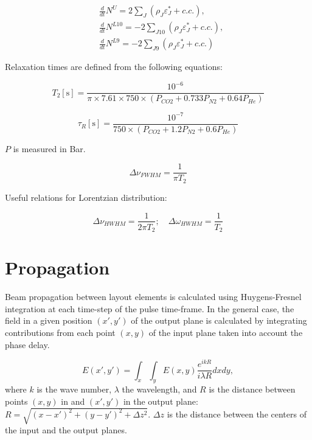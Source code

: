 \documentclass{report}
\begin{document}
\begin{align}\label{eq:dNdt}
&\frac{d}{dt}N^U = 2\sum\limits_J (\rho _J\varepsilon _J^* + c.c.) ,\nonumber\\
&\frac{d}{dt}N^{L10} =  -2\sum\limits_{J10} (\rho _J\varepsilon _J^* + c.c.),\\
&\frac{d}{dt}N^{L9} =  -2\sum\limits_{J9} (\rho _J\varepsilon _J^* + c.c.)\nonumber
\end{align}

Relaxation times are defined from the following equations:

\begin{equation}\label{eq:T2}
T_2[\text{s}] = \frac{10^{- 6}}{\pi \times 7.61 \times 750 \times (P_{CO2}+0.733P_{N2}+0.64P_{He})}
\end{equation}

\begin{equation}\label{eq:tauR}
\tau _R[\text{s}] = \frac{10^{-7}}{750 \times (P_{CO2}+1.2P_{N2}+0.6P_{He})}
\end{equation}

$P$ is measured in Bar.

\begin{equation*}
\Delta\nu _{FWHM} = \frac{1}{\pi T_2}
\end{equation*}

Useful relations for Lorentzian distribution:

\begin{equation*}
\Delta\nu _{HWHM} = \frac{1}{2\pi T_2};\quad \Delta\omega _{HWHM} = \frac{1}{T_2}
\end{equation*}


\section{Propagation}

Beam propagation between layout elements is calculated using Huygens-Fresnel integration at each time-step of the pulse time-frame. In the general case, the field in a given position $(x',y')$ of the output plane is calculated by integrating contributions from each point $(x,y)$ of the input plane taken into account the phase delay.

\begin{equation*}
E(x', y') = \int_x\int_y E(x,y) \frac{e^{ikR}}{i\lambda R} dx dy,
\end{equation*}
where $k$ is the wave number, $\lambda$ the wavelength, and $R$ is the distance between points $(x,y)$ in and $(x',y')$ in the output plane: $R=\sqrt{(x-x')^2+(y-y')^2+\Delta z^2}$. $\Delta z$ is the distance between the centers of the input and the output planes.
\end{document}
